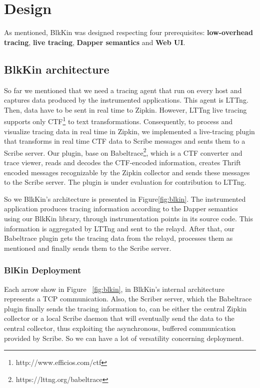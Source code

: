 \documentclass[a4paper,10pt,twocolumn]{article}
\begin{document}
\section{Design}
As mentioned, BlkKin was designed respecting four prerequisites:
\textbf{low-overhead tracing}, \textbf{live tracing}, \textbf{Dapper semantics}
and \textbf{Web UI}.

\subsection{BlkKin architecture}
So far we mentioned that we need a tracing agent that run on every host and
captures data produced by the instrumented applications. This agent is LTTng.
Then, data have to be sent in real time to Zipkin. However, LTTng live tracing
supports only CTF\footnote{http://www.efficios.com/ctf} to text
transformations. Consequently, to process and visualize tracing data in real
time in Zipkin, we implemented a live-tracing plugin that transforms in real
time CTF data to Scribe messages and sents them to a Scribe server. Our plugin,
base on Babeltrace\footnote{https://lttng.org/babeltrace}, which is a CTF
converter and trace viewer, reads and decodes the CTF-encoded information,
creates Thrift encoded messages recognizable by the Zipkin collector and sends
these messages to the Scribe server. The plugin is under evaluation for
contribution to LTTng.

So we BlkKin's architecture is presented in Figure\ref{fig:blkin}. The
instrumented application produces tracing information according to the Dapper
semantics using our BlkKin library, through instrumentation points in its source
code. This information is aggregated by LTTng and sent to the relayd. After
that, our Babeltrace plugin gets the tracing data from the relayd, processes
them as mentioned and finally sends them to the Scribe server.

\subsubsection{BlKin Deployment} Each arrow show in Figure ~\ref{fig:blkin}, in
BlkKin's internal architecture represents a TCP communication. Also, the
Scriber server, which the Babeltrace plugin finally sends the tracing
information to, can be either the central Zipkin collector or a local Scribe
daemon that will eventually send the data to the central collector, thus
exploiting the asynchronous, buffered communication provided by Scribe. So we
can have a lot of versatility concerning deployment.
\end{document}
